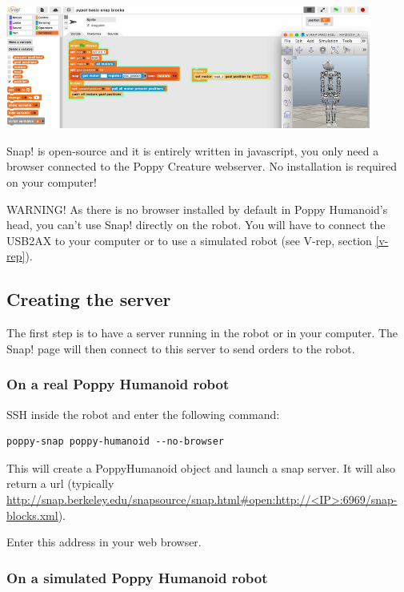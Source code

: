 \documentclass{article}
\begin{document}
 \begin{center}
  \includegraphics[width=0.9\textwidth]{img/snap-header}
 \end{center}

Snap! is open-source and it is entirely written in javascript, you only need a browser connected to the Poppy Creature webserver. No installation is required on your computer!

WARNING! As there is no browser installed by default in Poppy Humanoid's head, you can't use Snap! directly on the robot. You will have to connect the USB2AX to your computer or to use a simulated robot (see V-rep, section \ref{v-rep}).

\subsection{Creating the server}

The first step is to have a server running in the robot or in your computer. The Snap! page will then connect to this server to send orders to the robot.

\subsubsection{On a real Poppy Humanoid robot}

SSH inside the robot and enter the following command:

\begin{verbatim}
poppy-snap poppy-humanoid --no-browser
\end{verbatim}

This will create a PoppyHumanoid object and launch a snap server. It will also return a url (typically \url{http://snap.berkeley.edu/snapsource/snap.html#open:http://<IP>:6969/snap-blocks.xml}).

Enter this address in your web browser.

\subsubsection{On a simulated Poppy Humanoid robot}
\end{document}
